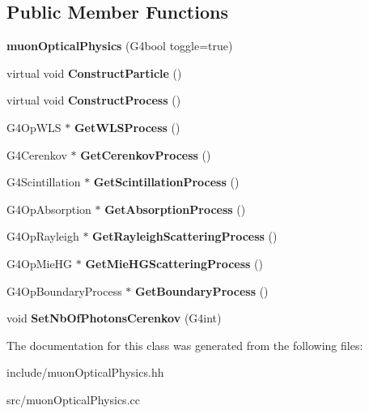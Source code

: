\subsection*{Public Member Functions}
\begin{DoxyCompactItemize}
\item 
\mbox{\label{classmuonOpticalPhysics_a52eeca699e5ceef8bbf6b7e6aa2911d8}} 
{\bfseries muon\+Optical\+Physics} (G4bool toggle=true)
\item 
\mbox{\label{classmuonOpticalPhysics_a0d4026c22223e1cbe9c4db0e4d45699d}} 
virtual void {\bfseries Construct\+Particle} ()
\item 
\mbox{\label{classmuonOpticalPhysics_aee337a42afb4af85865cde2e460e120f}} 
virtual void {\bfseries Construct\+Process} ()
\item 
\mbox{\label{classmuonOpticalPhysics_a257a178b6e1a98c10d9001fe43d0b1c8}} 
G4\+Op\+W\+LS $\ast$ {\bfseries Get\+W\+L\+S\+Process} ()
\item 
\mbox{\label{classmuonOpticalPhysics_a6588a993cc57cade05bb1371c60bf914}} 
G4\+Cerenkov $\ast$ {\bfseries Get\+Cerenkov\+Process} ()
\item 
\mbox{\label{classmuonOpticalPhysics_acda9b8ac8d073939523c861833c343ce}} 
G4\+Scintillation $\ast$ {\bfseries Get\+Scintillation\+Process} ()
\item 
\mbox{\label{classmuonOpticalPhysics_a0e66d292a9509fdc6703fcdea0e38c7d}} 
G4\+Op\+Absorption $\ast$ {\bfseries Get\+Absorption\+Process} ()
\item 
\mbox{\label{classmuonOpticalPhysics_a443ff15987bae9b5d07155252f7fad9b}} 
G4\+Op\+Rayleigh $\ast$ {\bfseries Get\+Rayleigh\+Scattering\+Process} ()
\item 
\mbox{\label{classmuonOpticalPhysics_a57eae82cad6cd757dd6e283598a4bf54}} 
G4\+Op\+Mie\+HG $\ast$ {\bfseries Get\+Mie\+H\+G\+Scattering\+Process} ()
\item 
\mbox{\label{classmuonOpticalPhysics_ad1abfb3c7d0cea07d456c5651390b168}} 
G4\+Op\+Boundary\+Process $\ast$ {\bfseries Get\+Boundary\+Process} ()
\item 
\mbox{\label{classmuonOpticalPhysics_a99125ac76dc52e14be98e0a1326d3f71}} 
void {\bfseries Set\+Nb\+Of\+Photons\+Cerenkov} (G4int)
\end{DoxyCompactItemize}


The documentation for this class was generated from the following files\+:\begin{DoxyCompactItemize}
\item 
include/muon\+Optical\+Physics.\+hh\item 
src/muon\+Optical\+Physics.\+cc\end{DoxyCompactItemize}
